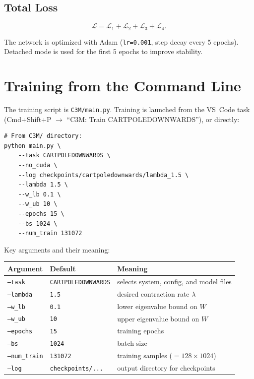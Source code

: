 \documentclass[11pt,a4paper]{article}
\begin{document}
\subsection{Total Loss}

\[
\mathcal{L} = \mathcal{L}_1 + \mathcal{L}_2 + \mathcal{L}_3 + \mathcal{L}_4.
\]

The network is optimized with Adam (\texttt{lr=0.001}, step decay every 5 epochs).  Detached mode is used for the first 5 epochs to improve stability.

\section{Training from the Command Line}

The training script is \texttt{C3M/main.py}. Training is launched from the VS~Code task (Cmd+Shift+P $\to$ ``C3M: Train CARTPOLEDOWNWARDS''), or directly:

\begin{lstlisting}[style=python]
# From C3M/ directory:
python main.py \
    --task CARTPOLEDOWNWARDS \
    --no_cuda \
    --log checkpoints/cartpoledownwards/lambda_1.5 \
    --lambda 1.5 \
    --w_lb 0.1 \
    --w_ub 10 \
    --epochs 15 \
    --bs 1024 \
    --num_train 131072
\end{lstlisting}

Key arguments and their meaning:

\begin{center}
\begin{tabular}{lll}
\toprule
\textbf{Argument} & \textbf{Default} & \textbf{Meaning} \\
\midrule
\texttt{--task}       & \texttt{CARTPOLEDOWNWARDS} & selects system, config, and model files \\
\texttt{--lambda}     & \texttt{1.5} & desired contraction rate \(\lambda\) \\
\texttt{--w\_lb}      & \texttt{0.1} & lower eigenvalue bound on \(W\) \\
\texttt{--w\_ub}      & \texttt{10}  & upper eigenvalue bound on \(W\) \\
\texttt{--epochs}     & \texttt{15}  & training epochs \\
\texttt{--bs}         & \texttt{1024} & batch size \\
\texttt{--num\_train} & \texttt{131072} & training samples (\(= 128 \times 1024\)) \\
\texttt{--log}        & \texttt{checkpoints/...} & output directory for checkpoints \\
\bottomrule
\end{tabular}
\end{center}
\end{document}
